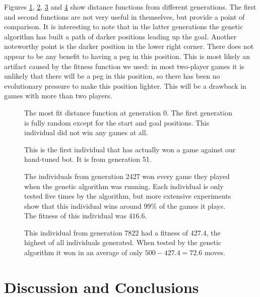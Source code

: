 \documentclass[a4paper,11pt]{article}
\begin{document}
Figures \ref{genpop0}, \ref{genpop51}, \ref{genpop2427} and
\ref{genpop7822} show distance functions from different generations.
The first and second functions are not very useful in themselves, but
provide a point of comparison. It is interesting to note that in the
latter generations the genetic algorithm has built a path of darker
positions leading up the goal. Another noteworthy point is the darker
position in the lower right corner. There does not appear to be any
benefit to having a peg in this position. This is most likely an
artifact caused by the fitness function we used: in most two-player
games it is unlikely that there will be a peg in this position, so
there has been no evolutionary pressure to make this position lighter.
This will be a drawback in games with more than two players.

\begin{figure}
\centering

\caption{The most fit distance function at generation 0. The first
  generation is fully random except for the start and goal positions.
  This individual did not win any games at all.}
\label{genpop0}
\end{figure}

\begin{figure}
\centering

\caption{This is the first individual that has actually won a game
  against our hand-tuned bot. It is from generation 51.}
\label{genpop51}
\end{figure}

\begin{figure}
\centering

\caption{The individuals from generation 2427 won every game they
  played when the genetic algorithm was running. Each individual is
  only tested five times by the algorithm, but more extensive
  experiments show that this individual wins around $99\%$ of the
  games it plays. The fitness of this individual was $416.6$.}
\label{genpop2427}
\end{figure}

\begin{figure}
\centering

\caption{This individual from generation 7822 had a fitness of
  $427.4$, the highest of all individuals generated. When tested by
  the genetic algorithm it won in an average of only $500-427.4=72.6$
  moves.}
\label{genpop7822}
\end{figure}

\section{Discussion and Conclusions}
\end{document}
